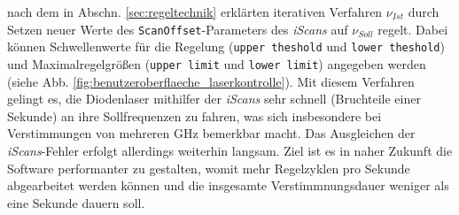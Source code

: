 nach dem in Abschn. \ref{sec:regeltechnik} erklärten iterativen Verfahren
$\nu_{Ist}$ durch Setzen neuer Werte des
\lstinline|ScanOffset|-Parameters des \textit{iScans} auf $\nu_{Soll}$ regelt.
Dabei können Schwellenwerte für die Regelung (\lstinline|upper theshold| und
\lstinline|lower theshold|) und Maximalregelgrößen (\lstinline|upper limit| und
\lstinline|lower limit|) angegeben werden (siehe Abb.
\ref{fig:benutzeroberflaeche_laserkontrolle}). Mit diesem Verfahren gelingt es,
die Diodenlaser mithilfer der \textit{iScans} sehr schnell (Bruchteile einer
Sekunde) an ihre Sollfrequenzen zu fahren, was sich insbesondere bei
Verstimmungen von mehreren GHz bemerkbar macht. Das Ausgleichen der
\textit{iScans}-Fehler erfolgt allerdings weiterhin langsam. Ziel ist es
in naher Zukunft die Software performanter zu gestalten, womit mehr
Regelzyklen pro Sekunde abgearbeitet werden können und die insgesamte
Verstimmnungsdauer weniger als eine Sekunde dauern soll.


